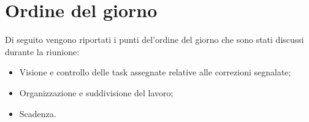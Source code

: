 \clearpage
\section{Ordine del giorno}
Di seguito vengono riportati i punti del’ordine del giorno che sono stati discussi durante la riunione:
\begin{itemize}
	\item Visione e controllo delle task assegnate relative alle correzioni segnalate;
	\item Organizzazione e suddivisione del lavoro;
	\item Scadenza.
\end{itemize}